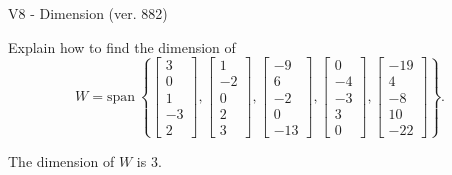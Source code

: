 \begin{exercise}
  \begin{exerciseTitle}V8 - Dimension (ver. 882)\end{exerciseTitle}
  \begin{exerciseStatement}
    Explain how to find the dimension of 
\[W=\mathrm{span}\ \left\{\left[\begin{array}{r}
3 \\
0 \\
1 \\
-3 \\
2
\end{array}\right] , \left[\begin{array}{r}
1 \\
-2 \\
0 \\
2 \\
3
\end{array}\right] , \left[\begin{array}{r}
-9 \\
6 \\
-2 \\
0 \\
-13
\end{array}\right] , \left[\begin{array}{r}
0 \\
-4 \\
-3 \\
3 \\
0
\end{array}\right] , \left[\begin{array}{r}
-19 \\
4 \\
-8 \\
10 \\
-22
\end{array}\right]\right\}.\]



  \end{exerciseStatement}
  \begin{exerciseAnswer}
   The dimension of \(W\) is  \(3\).
  


  \end{exerciseAnswer}
\end{exercise}